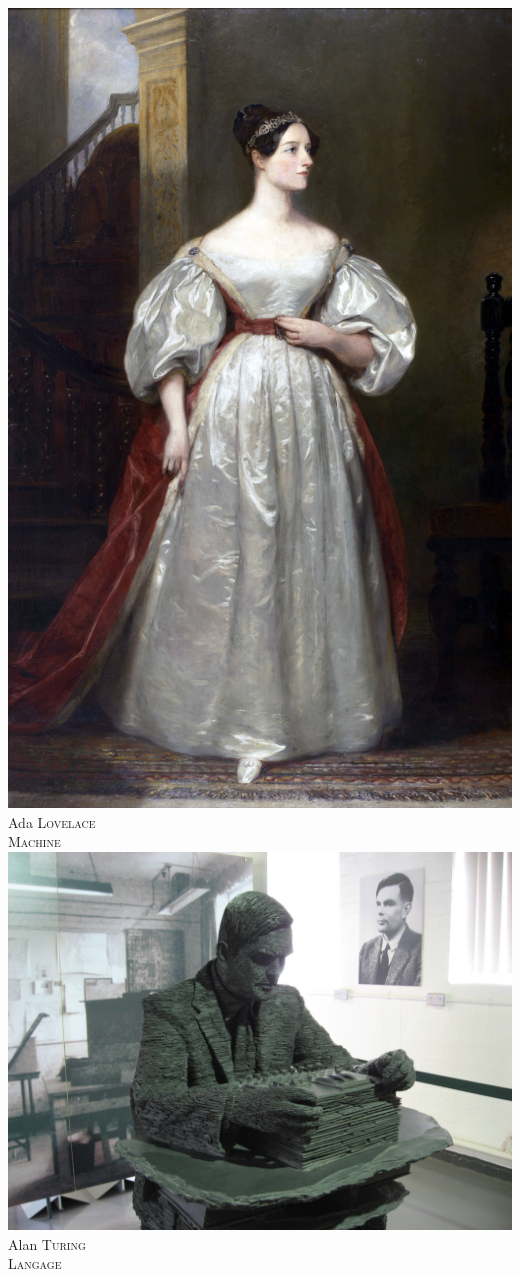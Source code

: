 {\includegraphics[width=0.725\linewidth]{./Images/Chapter00/ada-lovelace.jpg}\\ Ada \textsc{Lovelace}\\[10pt]
\textsc{Machine}\\[4pt]
\includegraphics[width=0.725\linewidth]{./Images/Chapter00/alan-turing.jpg}\\ Alan \textsc{Turing}\\[10pt]
\textsc{Langage}\\[4pt]
}
